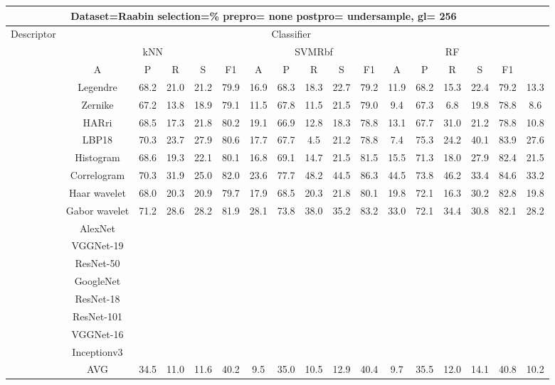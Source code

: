 \documentclass[12pt,italian]{article}
\begin{document}
\begin{tiny}
\begin{longtable}{lcccccccccccccccc}
\toprule
\multicolumn{16}{c}{Dataset=Raabin selection=\% prepro= none postpro= undersample, gl= 256} \\ 
\toprule
Descriptor & \multicolumn{15}{c}{Classifier} \\ 
& \multicolumn{5}{c}{kNN} & \multicolumn{5}{c}{SVMRbf} & \multicolumn{5}{c}{RF} \\ 
& A & P & R & S & F1 & A & P & R & S & F1 & A & P & R & S & F1 \\ 
\midrule
& Legendre & 68.2 & 21.0 & 21.2 & 79.9 & 16.9 & 68.3 & 18.3 & 22.7 & 79.2 & 11.9 & 68.2 & 15.3 & 22.4 & 79.2 & 13.3 \\ 
& Zernike & 67.2 & 13.8 & 18.9 & 79.1 & 11.5 & 67.8 & 11.5 & 21.5 & 79.0 &  9.4 & 67.3 &  6.8 & 19.8 & 78.8 &  8.6 \\ 
& HARri & 68.5 & 17.3 & 21.8 & 80.2 & 19.1 & 66.9 & 12.8 & 18.3 & 78.8 & 13.1 & 67.7 & 31.0 & 21.2 & 78.8 & 10.8 \\ 
& LBP18 & 70.3 & 23.7 & 27.9 & 80.6 & 17.7 & 67.7 &  4.5 & 21.2 & 78.8 &  7.4 & 75.3 & 24.2 & 40.1 & 83.9 & 27.6 \\ 
& Histogram & 68.6 & 19.3 & 22.1 & 80.1 & 16.8 & 69.1 & 14.7 & 21.5 & 81.5 & 15.5 & 71.3 & 18.0 & 27.9 & 82.4 & 21.5 \\ 
& Correlogram & 70.3 & 31.9 & 25.0 & 82.0 & 23.6 & 77.7 & 48.2 & 44.5 & 86.3 & 44.5 & 73.8 & 46.2 & 33.4 & 84.6 & 33.2 \\ 
& Haar wavelet & 68.0 & 20.3 & 20.9 & 79.7 & 17.9 & 68.5 & 20.3 & 21.8 & 80.1 & 19.8 & 72.1 & 16.3 & 30.2 & 82.8 & 19.8 \\ 
& Gabor wavelet & 71.2 & 28.6 & 28.2 & 81.9 & 28.1 & 73.8 & 38.0 & 35.2 & 83.2 & 33.0 & 72.1 & 34.4 & 30.8 & 82.1 & 28.2 \\ 
& AlexNet \\ 
& VGGNet-19 \\ 
& ResNet-50 \\ 
& GoogleNet \\ 
& ResNet-18 \\ 
& ResNet-101 \\ 
& VGGNet-16 \\ 
& Inceptionv3 \\ 
\hline
& AVG & 34.5 & 11.0 & 11.6 & 40.2 &  9.5 & 35.0 & 10.5 & 12.9 & 40.4 &  9.7 & 35.5 & 12.0 & 14.1 & 40.8 & 10.2 \\ 
\hline
\bottomrule
\end{longtable} 


\end{tiny}
\end{document}
